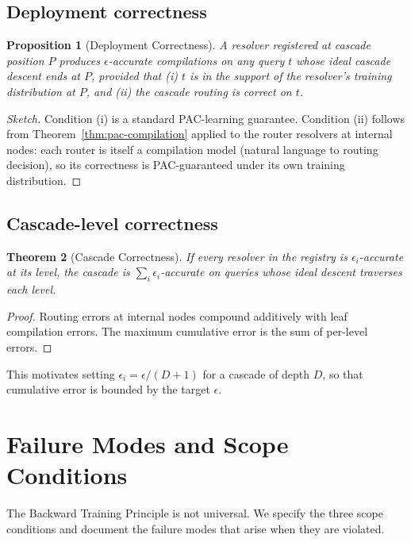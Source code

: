 \documentclass[twocolumn,11pt,a4paper]{article}
\newtheorem{theorem}{Theorem}[section]
\newtheorem{proposition}[theorem]{Proposition}
\begin{document}
\subsection{Deployment correctness}

\begin{proposition}[Deployment Correctness]
\label{prop:deployment-correctness}
A resolver registered at cascade position $P$ produces $\epsilon$-accurate compilations on any query $t$ whose \emph{ideal} cascade descent ends at $P$, provided that (i) $t$ is in the support of the resolver's training distribution at $P$, and (ii) the cascade routing is correct on $t$.
\end{proposition}

\begin{proof}[Sketch]
Condition (i) is a standard PAC-learning guarantee. Condition (ii) follows from Theorem~\ref{thm:pac-compilation} applied to the router resolvers at internal nodes: each router is itself a compilation model (natural language to routing decision), so its correctness is PAC-guaranteed under its own training distribution.
\end{proof}

\subsection{Cascade-level correctness}

\begin{theorem}[Cascade Correctness]
\label{thm:cascade-correctness}
If every resolver in the registry is $\epsilon_i$-accurate at its level, the cascade is $\sum_i \epsilon_i$-accurate on queries whose ideal descent traverses each level.
\end{theorem}

\begin{proof}
Routing errors at internal nodes compound additively with leaf compilation errors. The maximum cumulative error is the sum of per-level errors.
\end{proof}

This motivates setting $\epsilon_i = \epsilon / (D + 1)$ for a cascade of depth $D$, so that cumulative error is bounded by the target $\epsilon$.


\section{Failure Modes and Scope Conditions}
\label{sec:failure-modes}

The Backward Training Principle is not universal. We specify the three scope conditions and document the failure modes that arise when they are violated.
\end{document}
